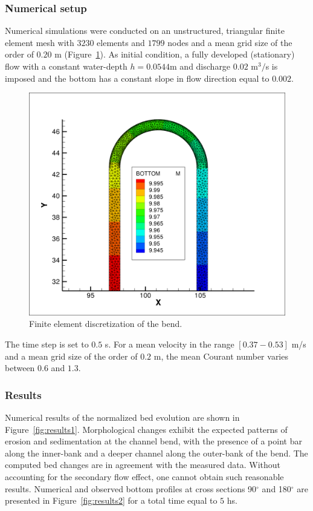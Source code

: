 %
%
\subsubsection{Numerical setup}
%
Numerical simulations were conducted on an unstructured, triangular finite element mesh with
$3230$ elements and $1799$ nodes and a mean grid size of the order of $0.20$ m (Figure~\ref{fig:mesh}). 
As initial condition, a fully developed (stationary) flow with a constant water-depth $h = 0.0544$m and discharge $0.02$ m$^3/$s is imposed and the bottom has a constant slope in flow direction equal to $0.002$. 

\begin{figure} [!h]
\centering
\includegraphics[scale=0.15]{../img/yen_grid_bottom.png}
 \caption{Finite element discretization of the bend.}\label{fig:mesh}
\end{figure}

The time step is set to $0.5$ s. For a mean velocity in the range $[0.37-0.53]$ m/s and 
a mean grid size of the order of $0.2$ m, the mean Courant number varies between $0.6$ and $1.3$. 

\subsubsection{Results}
%
Numerical results of the normalized bed evolution are shown in Figure~\ref{fig:results1}. Morphological changes exhibit the expected
patterns of erosion and sedimentation at the channel bend, with the presence of a point bar along the inner-bank and a deeper channel along the outer-bank of the bend.
The computed bed changes are in agreement with the measured data. Without accounting for the secondary flow effect, one cannot obtain such reasonable results.
Numerical and observed bottom profiles at cross sections 90$^{\circ}$ and 180$^{\circ}$ are presented in Figure~\ref{fig:results2} for a total time equal to $5$ hs. 
 
